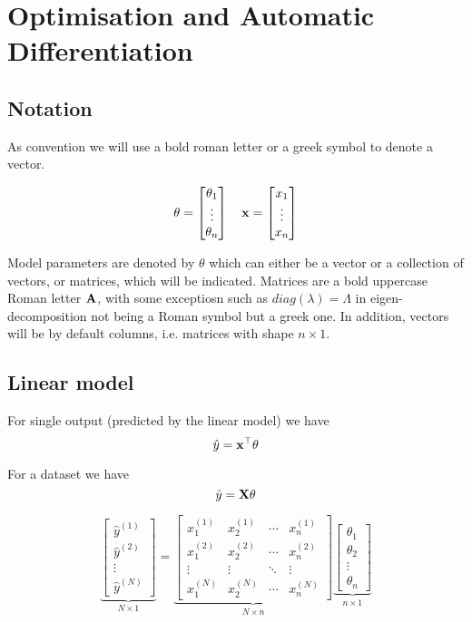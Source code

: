 \chapter{Optimisation and Automatic Differentiation}


\section{Notation}
As convention we will use a bold roman letter or a greek symbol to denote a vector.

\[
    \theta = \begin{bmatrix}
        \theta_1 \\ \vdots \\ \theta_n
    \end{bmatrix}
    \quad
    \mathbf{x} = \begin{bmatrix}
        x_1 \\ \vdots \\ x_n
    \end{bmatrix}
\]

Model parameters are denoted by $\theta$ which can either be a vector or a collection of vectors, or matrices, which will be indicated. Matrices are a bold uppercase Roman letter $\mathbf{A}$, with some exceptiosn such as $diag(\lambda) = \Lambda$ in eigen-decomposition not being a Roman symbol but a greek one. In addition, vectors will be by default columns, i.e. matrices with shape $n \times 1$.


\section{Linear model}

For single output (predicted by the linear model) we have \[\hat{y} = \mathbf{x} ^\top \theta\]

For a dataset we have \[\hat{y} = \mathbf{X} \theta\]

\[
    \underbrace{
        \begin{bmatrix}
            \hat{y}^{(1)} \\
            \hat{y}^{(2)} \\
            \vdots        \\
            \hat{y}^{(N)}
        \end{bmatrix}}_{N \times 1}
    =
    \underbrace{
        \begin{bmatrix}
            x_1^{(1)} & x_2^{(1)} & \cdots & x_n^{(1)} \\
            x_1^{(2)} & x_2^{(2)} & \cdots & x_n^{(2)} \\
            \vdots    & \vdots    & \ddots & \vdots    \\
            x_1^{(N)} & x_2^{(N)} & \cdots & x_n^{(N)}
        \end{bmatrix}}_{N \times n}
    \underbrace{
        \begin{bmatrix}
            \theta_1 \\
            \theta_2 \\
            \vdots   \\
            \theta_n
        \end{bmatrix}}_{n \times 1}
\]

